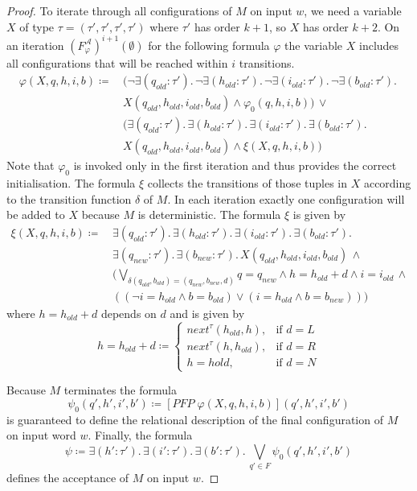 \begin{proof}
    To iterate through all configurations of $M$ on input $w$, we need a variable $X$ of type $\tau =
    (\tau', \tau', \tau', \tau')$ where $\tau'$ has order $k + 1$, so $X$ has order $k + 2$. On an iteration
    $(F_\varphi^\mathcal{A})^{i+1}(\emptyset)$ for the following formula $\varphi$ the variable $X$ includes
    all configurations that will be reached within $i$ transitions.
    \begin{align*}
        \varphi(X, q, h, i, b) \coloneqq &\,(\neg \exists (q_{old} \colon \tau').\, \neg\exists
        (h_{old}
        \colon \tau').\, \neg\exists (i_{old} \colon \tau').\, \neg\exists (b_{old} \colon \tau').\,\\
        &\, X(q_{old}, h_{old}, i_{old}, b_{old}) \wedge \varphi_0(q, h, i, b)) \,\vee \\
        &\,(\exists (q_{old} \colon \tau').\, \exists (h_{old} \colon \tau').\, \exists (i_{old} \colon
        \tau').\, \exists (b_{old} \colon \tau').\,\\
        &\, X(q_{old}, h_{old}, i_{old}, b_{old}) \wedge \xi(X, q, h, i, b))
    \end{align*}
    Note that $\varphi_0$ is invoked only in the first iteration and thus provides the correct initialisation. The
    formula $\xi$ collects the transitions of those tuples in $X$ according to the transition function $\delta$ of
    $M$. In each iteration exactly one configuration will be added to $X$ because $M$ is deterministic.
    The formula $\xi$ is given by
    \begin{align*}
        \xi(X, q, h, i, b) \coloneqq &\,\exists (q_{old} \colon \tau').\, \exists (h_{old} \colon
        \tau').\, \exists (i_{old} \colon \tau').\, \exists (b_{old} \colon \tau').\, \\
        &\,\exists (q_{new} \colon \tau').\, \exists (b_{new} \colon \tau').\,X(q_{old}, h_{old}, i_{old},
        b_{old}) \,\wedge \\
        &\, (\underset{\delta(q_{old}, b_{old}) = (q_{new}, b_{new}, d)}{\bigvee} q = q_{new} \wedge h =
        h_{old} + d \wedge i = i_{old}\,\wedge\\&\, ((\neg i = h_{old} \wedge b =
        b_{old}) \vee (i = h_{old} \wedge b = b_{new})))
    \end{align*}
    where $h = h_{old} + d$ depends on $d$ and is given by
    \[h = h_{old} + d \coloneqq
    \begin{cases}
        next^\tau(h_{old}, h),  & \text{if } d = L\\
        next^\tau(h, h_{old}),  & \text{if } d = R\\
        h = h{old},  & \text{if } d = N
    \end{cases}\]

    Because $M$ terminates the formula
    \[\psi_0(q', h', i', b') \coloneqq [\mathit{PFP}\;\varphi(X, q, h, i, b)](q', h', i', b') \]
    is guaranteed to define the relational description of the final configuration of $M$ on input word $w$.
    Finally, the formula
    \[\psi \coloneqq \exists (h' \colon \tau').\, \exists (i' \colon \tau').\, \exists (b' \colon \tau').\,
    \underset{q' \in F}{\bigvee} \psi_0(q', h', i', b')\]
    defines the acceptance of $M$ on input $w$.
\end{proof}

